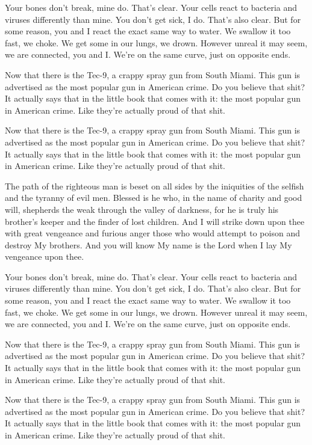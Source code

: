 \documentclass[11pt,twoside,a5paper,landscape,openright]{book}
\begin{document}
Your bones don't break, mine do. That's clear. Your cells react to bacteria and viruses differently than mine. You don't get sick, I do. That's also clear. But for some reason, you and I react the exact same way to water. We swallow it too fast, we choke. We get some in our lungs, we drown. However unreal it may seem, we are connected, you and I. We're on the same curve, just on opposite ends.

Now that there is the Tec-9, a crappy spray gun from South Miami. This gun is advertised as the most popular gun in American crime. Do you believe that shit? It actually says that in the little book that comes with it: the most popular gun in American crime. Like they're actually proud of that shit. 

Now that there is the Tec-9, a crappy spray gun from South Miami. This gun is advertised as the most popular gun in American crime. Do you believe that shit? It actually says that in the little book that comes with it: the most popular gun in American crime. Like they're actually proud of that shit. 

The path of the righteous man is beset on all sides by the iniquities of the selfish and the tyranny of evil men. Blessed is he who, in the name of charity and good will, shepherds the weak through the valley of darkness, for he is truly his brother's keeper and the finder of lost children. And I will strike down upon thee with great vengeance and furious anger those who would attempt to poison and destroy My brothers. And you will know My name is the Lord when I lay My vengeance upon thee.

Your bones don't break, mine do. That's clear. Your cells react to bacteria and viruses differently than mine. You don't get sick, I do. That's also clear. But for some reason, you and I react the exact same way to water. We swallow it too fast, we choke. We get some in our lungs, we drown. However unreal it may seem, we are connected, you and I. We're on the same curve, just on opposite ends.

Now that there is the Tec-9, a crappy spray gun from South Miami. This gun is advertised as the most popular gun in American crime. Do you believe that shit? It actually says that in the little book that comes with it: the most popular gun in American crime. Like they're actually proud of that shit. 

Now that there is the Tec-9, a crappy spray gun from South Miami. This gun is advertised as the most popular gun in American crime. Do you believe that shit? It actually says that in the little book that comes with it: the most popular gun in American crime. Like they're actually proud of that shit. 
\end{document}
